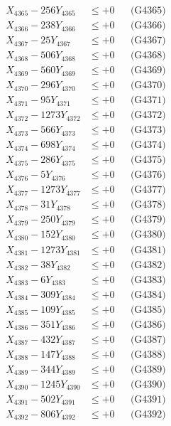 \documentclass[a4paper,10pt]{article}
\begin{document}
{\begin{align}
X_{4365} - 256Y_{4365} &\leq +0 && \text{(G4365)} \\
X_{4366} - 238Y_{4366} &\leq +0 && \text{(G4366)} \\
X_{4367} - 25Y_{4367} &\leq +0 && \text{(G4367)} \\
X_{4368} - 506Y_{4368} &\leq +0 && \text{(G4368)} \\
X_{4369} - 560Y_{4369} &\leq +0 && \text{(G4369)} \\
X_{4370} - 296Y_{4370} &\leq +0 && \text{(G4370)} \\
\allowbreak
X_{4371} - 95Y_{4371} &\leq +0 && \text{(G4371)} \\
X_{4372} - 1273Y_{4372} &\leq +0 && \text{(G4372)} \\
X_{4373} - 566Y_{4373} &\leq +0 && \text{(G4373)} \\
X_{4374} - 698Y_{4374} &\leq +0 && \text{(G4374)} \\
X_{4375} - 286Y_{4375} &\leq +0 && \text{(G4375)} \\
X_{4376} - 5Y_{4376} &\leq +0 && \text{(G4376)} \\
X_{4377} - 1273Y_{4377} &\leq +0 && \text{(G4377)} \\
X_{4378} - 31Y_{4378} &\leq +0 && \text{(G4378)} \\
X_{4379} - 250Y_{4379} &\leq +0 && \text{(G4379)} \\
X_{4380} - 152Y_{4380} &\leq +0 && \text{(G4380)} \\
\allowbreak
X_{4381} - 1273Y_{4381} &\leq +0 && \text{(G4381)} \\
X_{4382} - 38Y_{4382} &\leq +0 && \text{(G4382)} \\
X_{4383} - 6Y_{4383} &\leq +0 && \text{(G4383)} \\
X_{4384} - 309Y_{4384} &\leq +0 && \text{(G4384)} \\
X_{4385} - 109Y_{4385} &\leq +0 && \text{(G4385)} \\
X_{4386} - 351Y_{4386} &\leq +0 && \text{(G4386)} \\
X_{4387} - 432Y_{4387} &\leq +0 && \text{(G4387)} \\
X_{4388} - 147Y_{4388} &\leq +0 && \text{(G4388)} \\
X_{4389} - 344Y_{4389} &\leq +0 && \text{(G4389)} \\
X_{4390} - 1245Y_{4390} &\leq +0 && \text{(G4390)} \\
\allowbreak
X_{4391} - 502Y_{4391} &\leq +0 && \text{(G4391)} \\
X_{4392} - 806Y_{4392} &\leq +0 && \text{(G4392)} \\

\end{align}}
\end{document}
